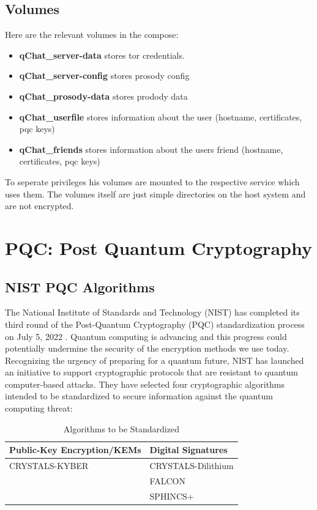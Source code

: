 \subsection{Volumes}

Here are the relevant volumes in the compose:

\begin{itemize}
	\item \textbf{qChat\_server-data} stores tor credentials.
	\item \textbf{qChat\_server-config} stores prosody config
	\item \textbf{qChat\_prosody-data} stores prodody data
	\item \textbf{qChat\_userfile} stores information about the user (hostname, certificates, pqc keys)
	\item \textbf{qChat\_friends} stores information about the users friend (hostname, certificates, pqc keys)
\end{itemize}

To seperate privileges his volumes are mounted to the respective service which uses them. The volumes itself are just simple directories on the host system and are not encrypted.

\section {PQC: Post Quantum Cryptography}
\label{sec:pqc}

\subsection{NIST PQC Algorithms}

The National Institute of Standards and Technology (NIST) has completed its third round of the Post-Quantum Cryptography (PQC) standardization process on July 5, 2022  \cite{nist2022pqccandidates}.
Quantum computing is advancing and this progress could potentially undermine the security of the encryption methods we use today.
Recognizing the urgency of preparing for a quantum future, NIST has launched an initiative to support cryptographic protocols
that are resistant to quantum computer-based attacks.
They have selected four cryptographic algorithms intended to be standardized to secure information against the quantum computing threat:\\

\begin{table}[h]
	\centering
	\begin{tabular}{ll}
		\hline
		\textbf{Public-Key Encryption/KEMs} & \textbf{Digital Signatures} \\
		\hline
		CRYSTALS-KYBER                      & CRYSTALS-Dilithium          \\
		                                    & FALCON                      \\
		                                    & SPHINCS+                    \\
		\hline
	\end{tabular}
	\caption{Algorithms to be Standardized}
	\label{tab:pqc_standardization}
\end{table}

